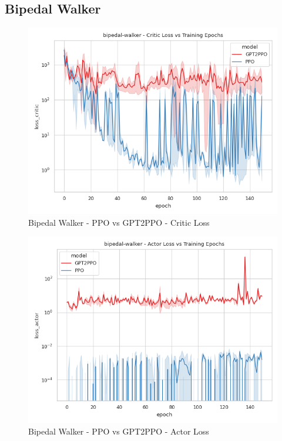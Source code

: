 \subsection{Bipedal Walker}

\begin{figure}[htbp]
    \centerline{\includegraphics[width=\columnwidth]{./img/bipedal-walker-loss_critic-model.png}}
    \caption{Bipedal Walker - PPO vs GPT2PPO - Critic Loss}
    \label{bipedal-walker-loss_critic-model}
\end{figure}

\begin{figure}[htbp]
    \centerline{\includegraphics[width=\columnwidth]{./img/bipedal-walker-loss_actor-model.png}}
    \caption{Bipedal Walker - PPO vs GPT2PPO - Actor Loss}
    \label{bipedal-walker-loss_actor-model}
\end{figure}

